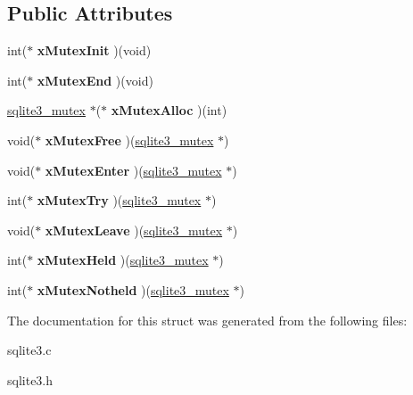 \subsection*{Public Attributes}
\begin{DoxyCompactItemize}
\item 
int($\ast$ {\bfseries x\+Mutex\+Init} )(void)\hypertarget{structsqlite3__mutex__methods_af0a78d79b6029444d4a2ac7c474030d4}{}\label{structsqlite3__mutex__methods_af0a78d79b6029444d4a2ac7c474030d4}

\item 
int($\ast$ {\bfseries x\+Mutex\+End} )(void)\hypertarget{structsqlite3__mutex__methods_a4963efb4bfede244d4d2a14510dbfe68}{}\label{structsqlite3__mutex__methods_a4963efb4bfede244d4d2a14510dbfe68}

\item 
\hyperlink{structsqlite3__mutex}{sqlite3\+\_\+mutex} $\ast$($\ast$ {\bfseries x\+Mutex\+Alloc} )(int)\hypertarget{structsqlite3__mutex__methods_a1092d5c1659c494c5235e884def5e275}{}\label{structsqlite3__mutex__methods_a1092d5c1659c494c5235e884def5e275}

\item 
void($\ast$ {\bfseries x\+Mutex\+Free} )(\hyperlink{structsqlite3__mutex}{sqlite3\+\_\+mutex} $\ast$)\hypertarget{structsqlite3__mutex__methods_a4e58d446a7225ce91073eb0af91d219a}{}\label{structsqlite3__mutex__methods_a4e58d446a7225ce91073eb0af91d219a}

\item 
void($\ast$ {\bfseries x\+Mutex\+Enter} )(\hyperlink{structsqlite3__mutex}{sqlite3\+\_\+mutex} $\ast$)\hypertarget{structsqlite3__mutex__methods_ac60f7bb165e9770949a8a2b2c2632830}{}\label{structsqlite3__mutex__methods_ac60f7bb165e9770949a8a2b2c2632830}

\item 
int($\ast$ {\bfseries x\+Mutex\+Try} )(\hyperlink{structsqlite3__mutex}{sqlite3\+\_\+mutex} $\ast$)\hypertarget{structsqlite3__mutex__methods_a45682df41bdfcb267a696090c80ebd06}{}\label{structsqlite3__mutex__methods_a45682df41bdfcb267a696090c80ebd06}

\item 
void($\ast$ {\bfseries x\+Mutex\+Leave} )(\hyperlink{structsqlite3__mutex}{sqlite3\+\_\+mutex} $\ast$)\hypertarget{structsqlite3__mutex__methods_acfa193f9130bfc68caf7f1849bcd0dac}{}\label{structsqlite3__mutex__methods_acfa193f9130bfc68caf7f1849bcd0dac}

\item 
int($\ast$ {\bfseries x\+Mutex\+Held} )(\hyperlink{structsqlite3__mutex}{sqlite3\+\_\+mutex} $\ast$)\hypertarget{structsqlite3__mutex__methods_a5d30a95c614bc08fe156c9ea0f0d88e8}{}\label{structsqlite3__mutex__methods_a5d30a95c614bc08fe156c9ea0f0d88e8}

\item 
int($\ast$ {\bfseries x\+Mutex\+Notheld} )(\hyperlink{structsqlite3__mutex}{sqlite3\+\_\+mutex} $\ast$)\hypertarget{structsqlite3__mutex__methods_a7bc1edfd01c67c6dcee26299bc31a7bf}{}\label{structsqlite3__mutex__methods_a7bc1edfd01c67c6dcee26299bc31a7bf}

\end{DoxyCompactItemize}


The documentation for this struct was generated from the following files\+:\begin{DoxyCompactItemize}
\item 
sqlite3.\+c\item 
sqlite3.\+h\end{DoxyCompactItemize}
